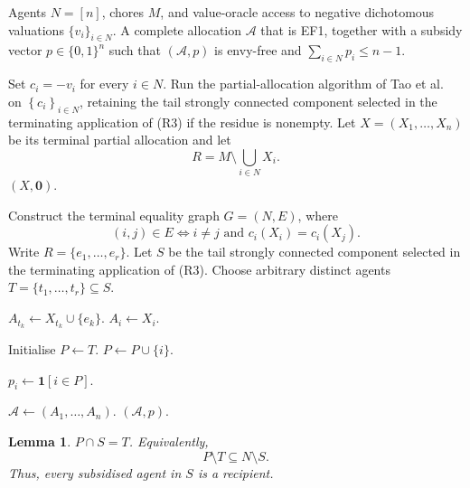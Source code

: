 \documentclass[sigconf,anonymous]{aamas}
\newcommand{\agents}{N}
\newcommand{\items}{M}
\newcommand{\cost}{c}
\newcommand{\set}[1]{\left\{#1\right\}}
\newcommand{\abs}[1]{\left\lvert#1\right\rvert}
\theoremstyle{acmplain}
\newtheorem{lemma}[theorem]{Lemma}
\theoremstyle{acmdefinition}
\theoremstyle{acmplain}
\begin{document}
\begin{algorithm}[H]
\caption{EF1 allocation with at most one unit of subsidy per agent for negative dichotomous valuations}
\label{alg:main}
\begin{algorithmic}[1]
\Require Agents $N=[n]$, chores $M$, and value-oracle access to negative
dichotomous valuations $\{v_i\}_{i\in N}$.
\Ensure A complete allocation $\mathcal{A}$ that is EF1, together with a
subsidy vector $p\in\{0,1\}^n$ such that $(\mathcal{A},p)$ is envy-free and
$\sum_{i\in N}p_i\le n-1$.

\State Set $c_i=-v_i$ for every $i\in N$.
\State Run the partial-allocation algorithm of Tao et al.~\cite{tao2025existence} on $\set{\cost_i}_{i\in\agents}$, retaining the tail strongly connected component selected in the terminating application of  \textnormal{(R3)} if the residue is nonempty.
\State Let $X=(X_1,\dots,X_n)$ be its terminal partial allocation and let
\[
R=\items\setminus\bigcup_{i\in\agents}X_i .
       \]
    \State \Return $(X,\mathbf 0)$.
\EndIf

\State Construct the terminal equality graph $G=(\agents,E)$, where
       \[
       (i,j)\in E
       \iff
       i\neq j
       \text{ and }
       \cost_i(X_i)=\cost_i(X_j).
       \]
\State Write $R=\{e_1,\ldots,e_r\}$.
\State Let $S$ be the tail strongly connected component selected in the
       terminating application of \textnormal{(R3)}.
       \Comment{$r<\abs S$}
\State Choose arbitrary distinct agents
      $T=\{t_1,\ldots,t_r\}\subseteq S$.

    \State $A_{t_k}\gets X_{t_k}\cup\{e_k\}$.
\EndFor
{}
    \State $A_i\gets X_i$.
\EndFor

\State Initialise $P\gets T$.
    \State $P\gets P\cup\{i\}$.
\EndWhile

    \State $p_i\gets \mathbf{1}[i\in P]$.
\EndFor

\State $\mathcal{A}\gets(A_1,\ldots,A_n)$.
\State \Return $(\mathcal{A},p)$.
\end{algorithmic}
\end{algorithm}


\begin{lemma}
\label{lem:m-Pstructure}
$P\cap S=T$. Equivalently,
\[P\setminus T\subseteq \agents\setminus S.
\] Thus, every subsidised agent in $S$ is a recipient.
\end{lemma}
\end{document}
